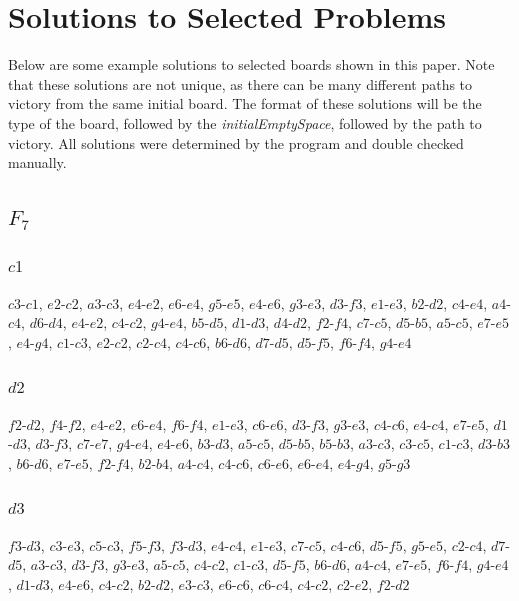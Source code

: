 \documentclass{article}
\begin{document}
\newpage
\appendix
\section{Solutions to Selected Problems} \label{appendix:solutions}
Below are some example solutions to selected boards shown in this paper. Note that these solutions are not unique, as there can be many different paths to victory from the same initial board. The format of these solutions will be the type of the board, followed by the \textit{initialEmptySpace}, followed by the path to victory. All solutions were determined by the program and double checked manually.
\subsection{$F_7$}
\subsubsection{\large $c1$}
$c3$-$c1$, $e2$-$c2$, $a3$-$c3$, $e4$-$e2$, $e6$-$e4$, $g5$-$e5$, $e4$-$e6$, $g3$-$e3$, $d3$-$f3$, $e1$-$e3$, $b2$-$d2$, $c4$-$e4$, $a4$-$c4$, $d6$-$d4$, $e4$-$e2$, $c4$-$c2$, $g4$-$e4$, $b5$-$d5$, $d1$-$d3$, $d4$-$d2$, $f2$-$f4$, $c7$-$c5$, $d5$-$b5$, $a5$-$c5$, $e7$-$e5$, $e4$-$g4$, $c1$-$c3$, $e2$-$c2$, $c2$-$c4$, $c4$-$c6$, $b6$-$d6$, $d7$-$d5$, $d5$-$f5$, $f6$-$f4$, $g4$-$e4$

\subsubsection{\large $d2$}
$f2$-$d2$, $f4$-$f2$, $e4$-$e2$, $e6$-$e4$, $f6$-$f4$, $e1$-$e3$, $c6$-$e6$, $d3$-$f3$, $g3$-$e3$, $c4$-$c6$, $e4$-$c4$, $e7$-$e5$, $d1$-$d3$, $d3$-$f3$, $c7$-$e7$, $g4$-$e4$, $e4$-$e6$, $b3$-$d3$, $a5$-$c5$, $d5$-$b5$, $b5$-$b3$, $a3$-$c3$, $c3$-$c5$, $c1$-$c3$, $d3$-$b3$, $b6$-$d6$, $e7$-$e5$, $f2$-$f4$, $b2$-$b4$, $a4$-$c4$, $c4$-$c6$, $c6$-$e6$, $e6$-$e4$, $e4$-$g4$, $g5$-$g3$

\subsubsection{\large $d3$}
$f3$-$d3$, $c3$-$e3$, $c5$-$c3$, $f5$-$f3$, $f3$-$d3$, $e4$-$c4$, $e1$-$e3$, $c7$-$c5$, $c4$-$c6$, $d5$-$f5$, $g5$-$e5$, $c2$-$c4$, $d7$-$d5$, $a3$-$c3$, $d3$-$f3$, $g3$-$e3$, $a5$-$c5$, $c4$-$c2$, $c1$-$c3$, $d5$-$f5$, $b6$-$d6$, $a4$-$c4$, $e7$-$e5$, $f6$-$f4$, $g4$-$e4$, $d1$-$d3$, $e4$-$e6$, $c4$-$c2$, $b2$-$d2$, $e3$-$c3$, $e6$-$c6$, $c6$-$c4$, $c4$-$c2$, $c2$-$e2$, $f2$-$d2$
\end{document}
